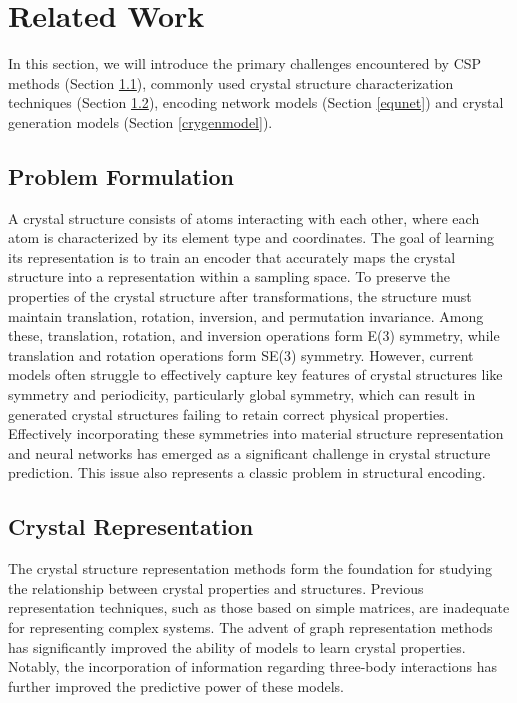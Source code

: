 \section{Related Work}
In this section, we will introduce the primary challenges encountered by CSP methods (Section \ref{profor}), commonly used crystal structure characterization techniques (Section \ref{cryrep}), encoding network models (Section \ref{equnet}) and crystal generation models (Section \ref{crygenmodel}).

\subsection{Problem Formulation}
\label{profor}
A crystal structure consists of atoms interacting with each other, where each atom is characterized by its element type and coordinates. The goal of learning its representation is to train an encoder that accurately maps the crystal structure into a representation within a sampling space. To preserve the properties of the crystal structure after transformations, the structure must maintain translation, rotation, inversion, and permutation invariance\cite{keating1966effect, lin2022general}. Among these, translation, rotation, and inversion operations form E(3) symmetry, while translation and rotation operations form SE(3) symmetry. However, current models often struggle to effectively capture key features of crystal structures like symmetry and periodicity, particularly global symmetry, which can result in generated crystal structures failing to retain correct physical properties. Effectively incorporating these symmetries into material structure representation and neural networks has emerged as a significant challenge in crystal structure prediction. This issue also represents a classic problem in structural encoding.

\subsection{Crystal Representation}
\label{cryrep}

The crystal structure representation methods form the foundation for studying the relationship between crystal properties and structures. Previous representation techniques, such as those based on simple matrices\cite{oubari:hal-04464893, dan2020generative, kim2020generative, long2021constrained}, are inadequate for representing complex systems. The advent of graph representation methods has significantly improved the ability of models to learn crystal properties\cite{xie2018crystal, schutt2018schnet, chen2019graph, chen2022universal, yuan2024tripartite}. Notably, the incorporation of information regarding three-body interactions has further improved the predictive power of these models.

